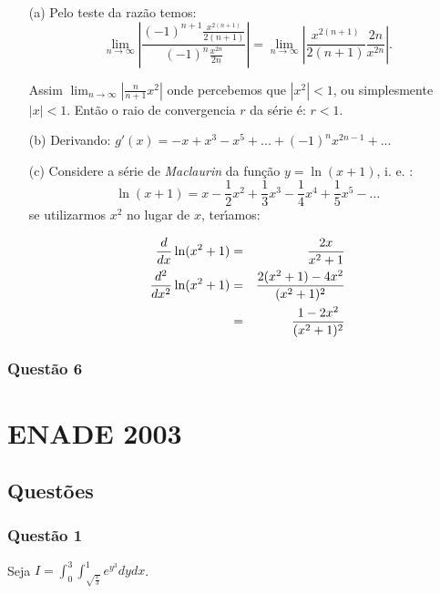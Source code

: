 \documentclass{report}
\begin{document}
\begin{enumerate}

\item[(a)] Pelo teste da raz\~ao temos: $$\lim_{n\to\infty}\left|\frac{(-1)^{n+1}\displaystyle \frac{x^{2(n+1)}}{2(n+1)}}{(-1)^n\displaystyle \frac{x^{2n}}{2n}}\right|=\lim_{n\to\infty}\left|\frac{x^{2(n+1)}}{2(n+1)}\frac{2n}{x^{2n}}\right|.$$

Assim $\lim_{n\to\infty} \left|\frac{n}{n+1}x^2\right|$ onde percebemos que $|x^2|<1$, ou simplesmente $|x|<1$. Ent\~ao o raio de convergencia $r$ da s\'erie \'e: $r<1$.

\item[(b)] Derivando: $g'(x)=\displaystyle -x+x^3-x^5+...+(-1)^n x^{2n-1}+...$

\item[(c)] Considere a s\'erie de {\it Maclaurin} da fun\c c\~ao $y=\ln(x+1)$, i. e. : $$\ln(x+1)=x - \frac1{2} x^2 + \frac1{3}x^3 - \frac1{4}x^4 + \frac1{5}x^5-\ldots$$ se utilizarmos $x^2$ no lugar de $x$, ter\'\i amos:

\begin{eqnarray*}
{d\over dx}\ln(x^2+1)&=&{2x\over x^2+1}\\
{d^2\over dx^2}\ln(x^2+1)&=&{2(x^2+1)-4x^2\over(x^2+1)^2}\\
&=&{1-2x^2\over(x^2+1)^2}
\end{eqnarray*}

\end{enumerate}

\subsection{\color{red} Quest\~ao 6}

\chapter{ENADE 2003}

\section{\color{blue} Quest\~oes}

\subsection{\color{blue} Quest\~ao 1}

Seja $I =\displaystyle \int_0 ^3\int_{\sqrt{\frac{x}{3}}}^1 e^{y^3} dydx$.
\end{document}
